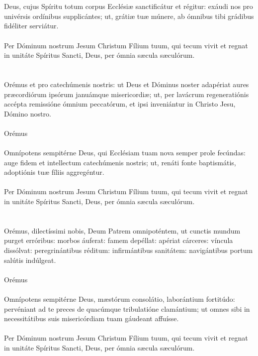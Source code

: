 \documentclass[12pt, a4paper]{article}
\begin{document}
	\\
	\\
	Deus, cujus Spíritu totum corpus Ecclésiæ sanctificátur et régitur: exáudi nos pro univérsis ordínibus supplicántes; ut, grátiæ tuæ múnere, ab ómnibus tibi grádibus fidéliter serviátur.
	\\\\
	Per Dóminum nostrum Jesum Christum Fílium tuum, qui tecum vivit et regnat in unitáte Spíritus Sancti, Deus, per ómnia sæcula sæculórum.
	\\\\
	\\
	Orémus et pro catechúmenis nostris: ut Deus et Dóminus noster adapériat aures præcordiórum ipsórum januámque misericordiæ; ut, per lavácrum regeneratiónis accépta remissióne ómnium peccatórum, et ipsi inveniántur in Christo Jesu, Dómino nostro.
	\\\\
	Orémus
	\\
	\\
	Omnípotens sempitérne Deus, qui Ecclésiam tuam nova semper prole fecúndas: auge fidem et intellectum catechúmenis nostris; ut, renáti fonte baptismátis, adoptiónis tuæ fíliis aggregéntur.
	\\\\
	Per Dóminum nostrum Jesum Christum Fílium tuum, qui tecum vivit et regnat in unitáte Spíritus Sancti, Deus, per ómnia sæcula sæculórum.
	\\\\
	\\
	Orémus, dilectíssimi nobis, Deum Patrem omnipoténtem, ut cunctis mundum purget erróribus: morbos áuferat: famem depéllat: apériat cárceres: víncula dissólvat: peregrinántibus réditum: infirmántibus sanitátem: navigántibus portum salútis indúlgeat.
	\\\\
	Orémus
	\\
	\\
	Omnípotens sempitérne Deus, mæstórum consolátio, laborántium fortitúdo: pervéniant ad te preces de quacúmque tribulatióne clamántium; ut omnes sibi in necessitátibus suis misericórdiam tuam gáudeant affuísse.
	\\\\
	Per Dóminum nostrum Jesum Christum Fílium tuum, qui tecum vivit et regnat in unitáte Spíritus Sancti, Deus, per ómnia sæcula sæculórum.
\end{document}
